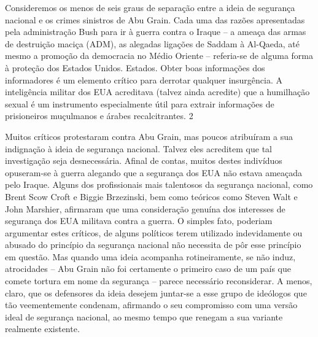 \par
 
Consideremos os menos de seis graus de separação entre a ideia de segurança nacional e os crimes sinistros de Abu Grain. Cada uma das razões apresentadas pela administração Bush para ir à guerra contra o Iraque – a ameaça das armas de destruição maciça (ADM), as alegadas ligações de Saddam à Al-Qaeda, até mesmo a promoção da democracia no Médio Oriente – referia-se de alguma forma à proteção dos Estados Unidos. Estados. Obter boas informações dos informadores é um elemento crítico para derrotar qualquer insurgência. A inteligência militar dos EUA acreditava (talvez ainda acredite) que a humilhação sexual é um instrumento especialmente útil para extrair informações de prisioneiros muçulmanos e árabes recalcitrantes.
 {\color{blue} 2}  

 
\par
 
Muitos críticos protestaram contra Abu Grain, mas poucos atribuíram a sua indignação à ideia de segurança nacional. Talvez eles acreditem que tal investigação seja desnecessária. Afinal de contas, muitos destes indivíduos opuseram-se à guerra alegando que a segurança dos EUA não estava ameaçada pelo Iraque. Alguns dos profissionais mais talentosos da segurança nacional, como Brent Scow Croft e Biggie Brzezinski, bem como teóricos como Steven Walt e John Marshier, afirmaram que uma consideração genuína dos interesses de segurança dos EUA militava contra a guerra. O simples fato, poderiam argumentar estes críticos, de alguns políticos terem utilizado indevidamente ou abusado do princípio da segurança nacional não necessita de pôr esse princípio em questão. Mas quando uma ideia acompanha rotineiramente, se não induz, atrocidades – Abu Grain não foi certamente o primeiro caso de um país que comete tortura em nome da segurança – parece necessário reconsiderar. A menos, claro, que os defensores da ideia desejem juntar-se a esse grupo de ideólogos que tão veementemente condenam, afirmando o seu compromisso com uma versão ideal de segurança nacional, ao mesmo tempo que renegam a sua variante realmente existente.
 
\par
 

